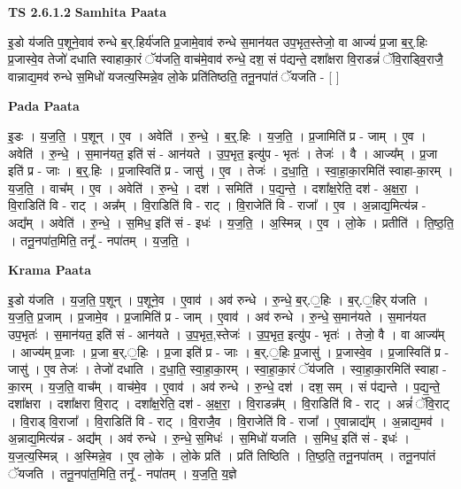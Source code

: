 \documentclass[17pt]{extarticle}
\begin{document}
\textbf{TS 2.6.1.2 } \newline
\textbf{Samhita Paata} \newline

इ॒डो य॑जति प॒शूने॒वाव॑ रुन्धे ब॒र्.हिर्य॑जति प्र॒जामे॒वाव॑ रुन्धे स॒मान॑यत उप॒भृत॒स्तेजो॒ वा आज्यं॑ प्र॒जा ब॒र्॒.हिः प्र॒जास्वे॒व तेजो॑ दधाति स्वाहाका॒रं ॅय॑जति॒ वाच॑मे॒वाव॑ रुन्धे॒ दश॒ सं प॑द्यन्ते॒ दशा᳚क्षरा वि॒राडन्नं॑ ॅवि॒राड्वि॒राजै॒ वान्नाद्य॒मव॑ रुन्धे स॒मिधो॑ यजत्य॒स्मिन्ने॒व लो॒के प्रति॑तिष्ठति॒ तनू॒नपा॑तं ॅयजति - [  ] \newline

\textbf{Pada Paata} \newline

इ॒डः । य॒ज॒ति॒ । प॒शून् । ए॒व । अवेति॑ । रु॒न्धे॒ । ब॒र्॒.हिः । य॒ज॒ति॒ । प्र॒जामिति॑ प्र - जाम् । ए॒व । अवेति॑ । रु॒न्धे॒ । स॒मान॑यत॒ इति॑ सं - आन॑यते । उ॒प॒भृत॒ इत्यु॑प - भृतः॑ । तेजः॑ । वै । आज्य᳚म् । प्र॒जा इति॑ प्र - जाः । ब॒र्॒.हिः । प्र॒जास्विति॑ प्र - जासु॑ । ए॒व । तेजः॑ । द॒धा॒ति॒ । स्वा॒हा॒का॒रमिति॑ स्वाहा-का॒रम् । य॒ज॒ति॒ । वाच᳚म् । ए॒व । अवेति॑ । रु॒न्धे॒ । दश॑ । समिति॑ । प॒द्य॒न्ते॒ । दशा᳚क्ष॒रेति॒ दश॑ - अ॒क्ष॒रा॒ । वि॒राडिति॑ वि - राट् । अन्न᳚म् । वि॒राडिति॑ वि - राट् । वि॒राजेति॑ वि - राजा᳚ । ए॒व । अ॒न्नाद्य॒मित्य॑न्न - अद्य᳚म् । अवेति॑ । रु॒न्धे॒ । स॒मिध॒ इति॑ सं - इधः॑ । य॒ज॒ति॒ । अ॒स्मिन्न् । ए॒व । लो॒के । प्रतीति॑ । ति॒ष्ठ॒ति॒ । तनू॒नपा॑त॒मिति॒ तनू᳚ - नपा॑तम् । य॒ज॒ति॒ ।  \newline


\textbf{Krama Paata} \newline

इ॒डो य॑जति । य॒ज॒ति॒ प॒शून् । प॒शूने॒व । ए॒वाव॑ । अव॑ रुन्धे । रु॒न्धे॒ ब॒र्.॒हिः । ब॒र्.॒हिर् य॑जति । य॒ज॒ति॒ प्र॒जाम् । प्र॒जामे॒व । प्र॒जामिति॑ प्र - जाम् । ए॒वाव॑ । अव॑ रुन्धे । रु॒न्धे॒ स॒मान॑यते । स॒मान॑यत उप॒भृतः॑ । स॒मान॑यत॒ इति॑ सं - आन॑यते । उ॒प॒भृत॒,स्तेजः॑ । उ॒प॒भृत॒ इत्यु॑प - भृतः॑ । तेजो॒ वै । वा आज्य᳚म् । आज्य॑म् प्र॒जाः । प्र॒जा ब॒र्.॒हिः । प्र॒जा इति॑ प्र - जाः । ब॒र्.॒हिः प्र॒जासु॑ । प्र॒जास्वे॒व । प्र॒जास्विति॑ प्र - जासु॑ । ए॒व तेजः॑ । तेजो॑ दधाति । द॒धा॒ति॒ स्वा॒हा॒का॒रम् । स्वा॒हा॒का॒रं ॅय॑जति । स्वा॒हा॒का॒रमिति॑ स्वाहा - का॒रम् । य॒ज॒ति॒ वाच᳚म् । वाच॑मे॒व । ए॒वाव॑ । अव॑ रुन्धे । रु॒न्धे॒ दश॑ । दश॒ सम् । सं प॑द्यन्ते । प॒द्य॒न्ते॒ दशा᳚क्षरा । दशा᳚क्षरा वि॒राट् । दशा᳚क्ष॒रेति॒ दश॑ - अ॒क्ष॒रा॒ । वि॒राडन्न᳚म् । वि॒राडिति॑ वि - राट् । अन्नं॑ ॅवि॒राट् । वि॒राड् वि॒राजा᳚ । वि॒राडिति॑ वि - राट् । वि॒राजै॒व । वि॒राजेति॑ वि - राजा᳚ । ए॒वान्नाद्य᳚म् । अ॒न्नाद्य॒मव॑ । अ॒न्नाद्य॒मित्य॑न्न - अद्य᳚म् । अव॑ रुन्धे । रु॒न्धे॒ स॒मिधः॑ । स॒मिधो॑ यजति । स॒मिध॒ इति॑ सं - इधः॑ । य॒ज॒त्य॒स्मिन्न् । अ॒स्मिन्ने॒व । ए॒व लो॒के । लो॒के प्रति॑ । प्रति॑ तिष्ठिति । ति॒ष्ठ॒ति॒ तनू॒नपा॑तम् । तनू॒नपा॑तं ॅयजति । तनू॒नपा॑त॒मिति॒ तनू᳚ - नपा॑तम् । य॒ज॒ति॒ य॒ज्ञे \newline
\end{document}
